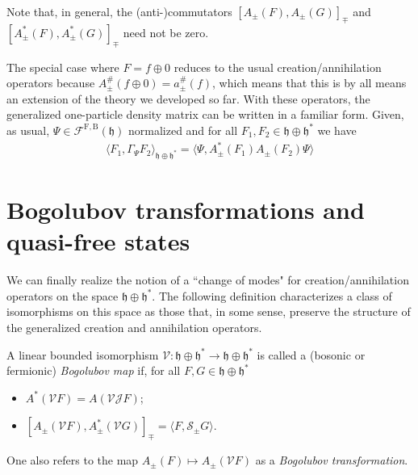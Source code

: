 \begin{remark}
	Note that, in general, the (anti-)commutators $[A_\pm(F),A_\pm(G)]_\mp$ and $[A^*_\pm(F),A^*_\pm(G)]_\mp$
	need not be zero.
\end{remark}

The special case where $F=f\oplus0$ reduces to the usual creation/annihilation operators because
$A^\#_\pm(f\oplus0)=a^\#_\pm(f)$, which means that this is by all means an extension of the
theory we developed so far. With these operators, the generalized one-particle density matrix
can be written in a familiar form. Given, as usual, $\Psi\in\mathcal{F}^{\mathrm{F,B}}(
\mathfrak{h})$ normalized and for all $F_1,F_2\in\mathfrak{h}\oplus\mathfrak{h}^*$ we have
\begin{align*}
	\langle F_1,\Gamma_\Psi F_2\rangle_{\mathfrak{h}\oplus\mathfrak{h}^*}
	= \langle \Psi, A^*_\pm(F_1)A_\pm(F_2)\Psi\rangle
\end{align*}

\section{Bogolubov transformations and quasi-free states}

We can finally realize the notion of a ``change of modes" for creation/annihilation operators
on the space $\mathfrak{h}\oplus\mathfrak{h}^*$. The following definition characterizes a class
of isomorphisms on this space as those that, in some sense, preserve the structure of the
generalized creation and annihilation operators.

\begin{definition}
	A linear bounded isomorphism $\mathcal{V} : \mathfrak{h}\oplus\mathfrak{h}^* \to \mathfrak{h}\oplus\mathfrak{h}^*$
	is called a (bosonic or fermionic) \textit{Bogolubov map} if, for all $F,G\in\mathfrak{h}\oplus\mathfrak{h}^*$
	\begin{itemize}
		\item $A^*(\mathcal{V}F) = A(\mathcal{VJ}F)$;
		\item $[A_\pm(\mathcal{V}F),A^*_\pm(\mathcal{V}G)]_\mp = \langle F,\mathcal{S}_\pm G\rangle$.
	\end{itemize}
	One also refers to the map $A_\pm(F)\longmapsto A_\pm(\mathcal{V}F)$ as a \textit{Bogolubov
	transformation}.
\end{definition}

